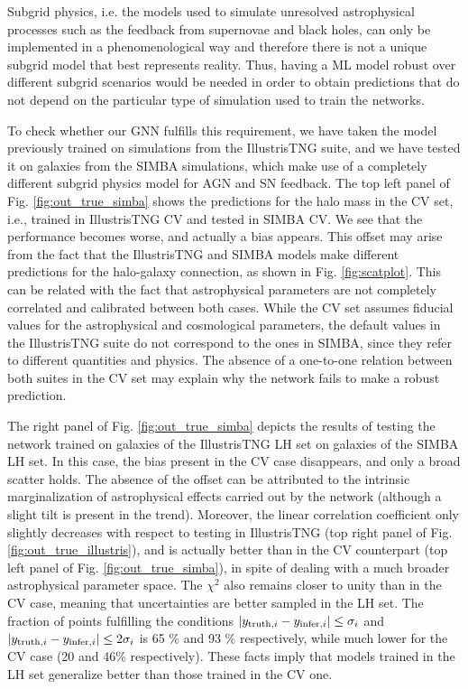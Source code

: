 \documentclass[twocolumn]{aastex631}
\begin{document}
Subgrid physics, i.e. the models used to simulate unresolved astrophysical processes such as the feedback from supernovae and black holes, can only be implemented in a phenomenological way and therefore there is not a unique subgrid model that best represents reality. Thus, having a ML model robust over different subgrid scenarios would be needed in order to obtain predictions that do not depend on the particular type of simulation used to train the networks. 

To check whether our GNN fulfills this requirement, we have taken the model previously trained on simulations from the IllustrisTNG suite, and we have tested it on galaxies from the SIMBA simulations, which make use of a completely different subgrid physics model for AGN and SN feedback. The top left panel of Fig. \ref{fig:out_true_simba} shows the predictions for the halo mass in the CV set, i.e., trained in IllustrisTNG CV and tested in SIMBA CV. We see that the performance becomes worse, and actually a bias appears. This offset may arise from the fact that the IllustrisTNG and SIMBA models make different predictions for the halo-galaxy connection, as shown in Fig. \ref{fig:scatplot}. This can be related with the fact that astrophysical parameters are not completely correlated and calibrated between both cases. While the CV set assumes fiducial values for the astrophysical and cosmological parameters, the default values in the IllustrisTNG suite do not correspond to the ones in SIMBA, since they refer to different quantities and physics. The absence of a one-to-one relation between both suites in the CV set may explain why the network fails to make a robust prediction.



The right panel of Fig. \ref{fig:out_true_simba} depicts the results of testing the network trained on galaxies of the IllustrisTNG LH set on galaxies of the SIMBA LH set. In this case, the bias present in the CV case disappears, and only a broad scatter holds. The absence of the offset can be attributed to the intrinsic marginalization of astrophysical effects carried out by the network (although a slight tilt is present in the trend). Moreover, the linear correlation coefficient only slightly decreases with respect to testing in IllustrisTNG (top right panel of Fig. \ref{fig:out_true_illustris}), and is actually better than in the CV counterpart (top left panel of Fig. \ref{fig:out_true_simba}), in spite of dealing with a much broader astrophysical parameter space. The $\chi^2$ also remains closer to unity than in the CV case, meaning that uncertainties are better sampled in the LH set. The fraction of points fulfilling the conditions $|y_{{\rm truth}, i} - y_{{\rm infer}, i}| \leq \sigma_i$ and $|y_{{\rm truth}, i} - y_{{\rm infer}, i}| \leq 2\sigma_i$ is 65 \% and 93 \% respectively, while much lower for the CV case (20 and 46\% respectively). These facts imply that models trained in the LH set generalize better than those trained in the CV one. 
\end{document}
